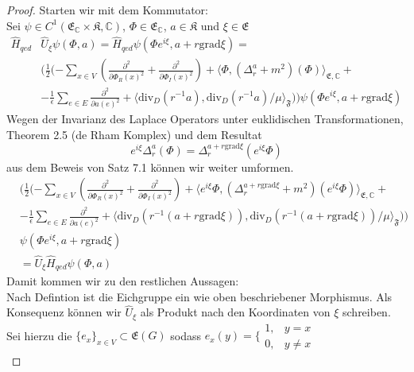 \documentclass[11pt,a4paper,leqno]{report}
\numberwithin{equation}{chapter}
\begin{document}
\begin{proof}
Starten wir mit dem Kommutator:\\
Sei $\psi\in C^1(\mathfrak{E}_\mathbb{C}\times\mathfrak{K},\mathbb{C})$, $\Phi\in \mathfrak{E}_\mathbb{C}$, $a\in \mathfrak{K}$ und $\xi\in \mathfrak{E}$
\begin{align*}
	\hat{H}_{qed}&\hat{U}_\xi\psi(\Phi, a)= \hat{H}_{qed}\psi(\Phi e^{i\xi}, a + r \text{grad}\xi)=\\&(\frac{1}{2}(-\sum_{x\in V}(\frac{\partial^2}{\partial\Phi_R(x)^2} +\frac{\partial^2}{\partial\Phi_I(x)^2})+\langle \Phi, (\Delta_r^a + m^2)(\Phi)\rangle_{\mathfrak{E},\mathbb{C}}+\\ &-\frac{1}{\epsilon}\sum_{e\in E}\frac{\partial^2}{\partial a(e)^2} + \langle \text{div}_D(r^{-1}a), \text{div}_D(r^{-1}a)/\mu\rangle_{\mathfrak{F}}))\psi(\Phi e^{i\xi}, a + r \text{grad}\xi)
\end{align*}
Wegen der Invarianz des Laplace Operators unter euklidischen Transformationen, Theorem 2.5 (de Rham Komplex) und dem Resultat
\begin{equation}
	e^{i\xi}\Delta_r^a(\Phi) = \Delta_r^{a + r\text{grad}\xi}(e^{i\xi}\Phi)
\end{equation}
aus dem Beweis von Satz 7.1 k\"onnen wir weiter umformen.
\begin{align*}
	&(\frac{1}{2}(-\sum_{x\in V}(\frac{\partial^2}{\partial\Phi_R(x)^2} +\frac{\partial^2}{\partial\Phi_I(x)^2})+\langle e^{i\xi}\Phi, (\Delta_r^{a+r\text{grad}\xi} + m^2)(e^{i\xi}\Phi)\rangle_{\mathfrak{E},\mathbb{C}}+\\ &-\frac{1}{\epsilon}\sum_{e\in E}\frac{\partial^2}{\partial a(e)^2} + \langle \text{div}_D(r^{-1}(a+r\text{grad}\xi)), \text{div}_D(r^{-1}(a+r\text{grad}\xi))/\mu\rangle_{\mathfrak{F}}))\\&\psi(\Phi e^{i\xi}, a + r \text{grad}\xi)\\
	&=\hat{U}_\xi\hat{H}_{qed}\psi(\Phi, a)
\end{align*}
Damit kommen wir zu den restlichen Aussagen:\\
Nach Defintion ist die Eichgruppe ein wie oben beschriebener Morphismus. Als Konsequenz k\"onnen wir $\hat{U}_\xi$ als Produkt nach den Koordinaten von $\xi$ schreiben.\\
Sei hierzu die $\{e_x\}_{x\in V}\subset\mathfrak{E}(G)$ sodass $e_x(y)=\{\begin{array}{ll} 1, & y=x \\
	0, & y\neq x\end{array}$
\begin{equation*}

\end{equation*}
\end{proof}
\end{document}

